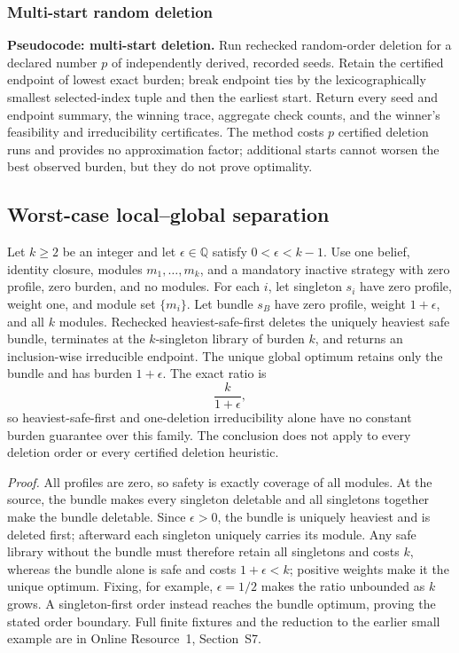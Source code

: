 \subsubsection{Multi-start random deletion}

\noindent\textbf{Pseudocode: multi-start deletion.}
Run rechecked random-order deletion for a declared number \(p\) of independently
derived, recorded seeds.  Retain the certified endpoint of lowest exact burden;
break endpoint ties by the lexicographically smallest selected-index tuple and
then the earliest start.  Return every seed and endpoint summary, the winning
trace, aggregate check counts, and the winner's feasibility and irreducibility
certificates.  The method costs \(p\) certified deletion runs and provides no
approximation factor; additional starts cannot worsen the best observed
burden, but they do not prove optimality.

\subsection{Worst-case local--global separation}
\label{sec:aor-safe-deletion-gap}

\begin{theorem}
\label{thm:aor-heaviest-safe-first-gap}
Let \(k\geq2\) be an integer and let
\(\epsilon\in\mathbb Q\) satisfy \(0<\epsilon<k-1\).  Use one belief,
identity closure, modules \(m_1,\ldots,m_k\), and a mandatory inactive
strategy with zero profile, zero burden, and no modules.  For each \(i\), let
singleton \(s_i\) have zero profile, weight one, and module set \(\{m_i\}\).
Let bundle \(s_B\) have zero profile, weight \(1+\epsilon\), and all \(k\)
modules.  Rechecked heaviest-safe-first deletes the uniquely heaviest safe
bundle, terminates at the \(k\)-singleton library of burden \(k\), and returns
an inclusion-wise irreducible endpoint.  The unique global optimum retains
only the bundle and has burden \(1+\epsilon\).  The exact ratio is
\[
  \frac{k}{1+\epsilon},
\]
so heaviest-safe-first and one-deletion irreducibility alone have no constant
burden guarantee over this family.  The conclusion does not apply to every
deletion order or every certified deletion heuristic.
\end{theorem}

\noindent\emph{Proof.}
All profiles are zero, so safety is exactly coverage of all modules.  At the
source, the bundle makes every singleton deletable and all singletons together
make the bundle deletable.  Since \(\epsilon>0\), the bundle is uniquely
heaviest and is deleted first; afterward each singleton uniquely carries its
module.  Any safe library without the bundle must therefore retain all
singletons and costs \(k\), whereas the bundle alone is safe and costs
\(1+\epsilon<k\); positive weights make it the unique optimum.  Fixing, for
example, \(\epsilon=1/2\) makes the ratio unbounded as \(k\) grows.  A
singleton-first order instead reaches the bundle optimum, proving the stated
order boundary.  Full finite fixtures and the reduction to the earlier small
example are in Online Resource~1, Section~S7.


